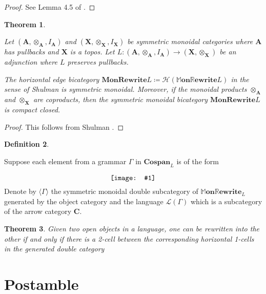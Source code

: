 \documentclass{amsart}
\newcommand{\A}{\cat{A}}
\newcommand{\C}{\cat{C}}
\newcommand{\X}{\cat{X}}
\newcommand{\cat}[1]{\mathbf{#1}}
\newcommand{\from}{\colon}
\newcommand{\diagram}[1]{\raisebox{-0.5\height}{\texttt{[image: \#1]}}}
\newcommand{\Cospan}{\mathbf{Cospan}}
\newcommand{\MonRewrite}{ \mathbf{MonRewrite}}
\newcommand{\MMonRewrite}{ \mathbb{M}\mathbf{on}\mathbb{R}\mathbf{ewrite} }
\newtheorem{theorem}{Theorem}[section]
\theoremstyle{remark}
\theoremstyle{definition}
\newtheorem{definition}[theorem]{Definition}
\begin{document}
\begin{proof}
	
  See Lemma 4.5 of \cite{sp-csp-top}.
  
\end{proof}

\begin{theorem} \label{thm:bi-mon-rewrite-scmm}

  Let $ (\A, \otimes_{ \A }, I_{ \A }) $ and
  $ (\X, \otimes_{\X}, I_{\X}) $ be symmetric monoidal categories
  where $ \A $ has pullbacks and $ \X $ is a topos. Let
  $ L \from (\A, \otimes_{ \A }, I_{ \A }) \to (\X, \otimes_{\X}) $
  be an adjunction where $ L $ preserves pullbacks.
	
  The horizontal edge bicategory
  $ \MonRewrite{L} \coloneqq \mathcal{H} \left( \MMonRewrite{L}
  \right) $ in the sense of Shulman is symmetric monoidal.  Moreover,
  if the monoidal products $ \otimes_{\A} $ and $ \otimes_{\X} $ are
  coproducts, then the symmetric monoidal bicategory
  $ \MonRewrite{L} $ is compact closed.
  
\end{theorem}

\begin{proof}
  
  This follows from Shulman \cite{shulman-constructing}.
  
\end{proof}

\begin{definition} \label{df:gramr-gen-dbl-cat}
	
 	Suppose each element from a grammar $ \Gamma $ in $ \Cospan_{L} $ is
  	of the form
	\[
		\diagram{diag_lr-grammar-2cell}
	\]
	Denote by $ \langle \Gamma \rangle $ the symmetric monoidal
	double subcategory of $ \MMonRewrite_{L} $ generated by the 
	object category and the language $ \mathcal{L} ( \Gamma ) $ 
	which is a subcategory of the arrow category $ \C $.  
        
\end{definition}

\begin{theorem}
  
  Given two open objects in a language, one can be rewritten into the other if and only if there is a 2-cell between the corresponding horizontal 1-cells in the generated double category
  
\end{theorem}


\section{Postamble} \label{sec:postable}



\end{document}
